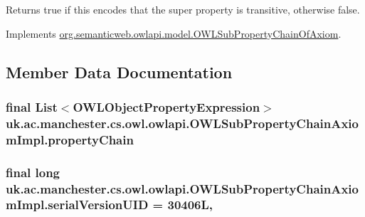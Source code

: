 \begin{DoxyReturn}{Returns}
{\ttfamily true} if this encodes that the super property is transitive, otherwise {\ttfamily false}. 
\end{DoxyReturn}


Implements \hyperlink{interfaceorg_1_1semanticweb_1_1owlapi_1_1model_1_1_o_w_l_sub_property_chain_of_axiom_af4e1cb9a1d76daea049618708a1a4e03}{org.\-semanticweb.\-owlapi.\-model.\-O\-W\-L\-Sub\-Property\-Chain\-Of\-Axiom}.



\subsection{Member Data Documentation}
\hypertarget{classuk_1_1ac_1_1manchester_1_1cs_1_1owl_1_1owlapi_1_1_o_w_l_sub_property_chain_axiom_impl_a2e9cd38ade9b321092820d5e01383020}{
\subsubsection[{property\-Chain}]{\setlength{\rightskip}{0pt plus 5cm}final List$<${\bf O\-W\-L\-Object\-Property\-Expression}$>$ uk.\-ac.\-manchester.\-cs.\-owl.\-owlapi.\-O\-W\-L\-Sub\-Property\-Chain\-Axiom\-Impl.\-property\-Chain\hspace{0.3cm}{\ttfamily [private]}}}\label{classuk_1_1ac_1_1manchester_1_1cs_1_1owl_1_1owlapi_1_1_o_w_l_sub_property_chain_axiom_impl_a2e9cd38ade9b321092820d5e01383020}
\hypertarget{classuk_1_1ac_1_1manchester_1_1cs_1_1owl_1_1owlapi_1_1_o_w_l_sub_property_chain_axiom_impl_acbd906340fe0e06760145f696a87fb0e}{
\subsubsection[{serial\-Version\-U\-I\-D}]{\setlength{\rightskip}{0pt plus 5cm}final long uk.\-ac.\-manchester.\-cs.\-owl.\-owlapi.\-O\-W\-L\-Sub\-Property\-Chain\-Axiom\-Impl.\-serial\-Version\-U\-I\-D = 30406\-L\hspace{0.3cm}{\ttfamily [static]}, {\ttfamily [private]}}}\label{classuk_1_1ac_1_1manchester_1_1cs_1_1owl_1_1owlapi_1_1_o_w_l_sub_property_chain_axiom_impl_acbd906340fe0e06760145f696a87fb0e}

